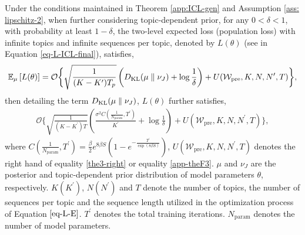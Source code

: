 \begin{theorem*} Under the conditions maintained in Theorem \ref{app:ICL-gen} and Assumption \ref{ass: lipschitz-2}, when further considering topic-dependent prior, for any $0<\delta < 1$, with probability at least $1-\delta$, the two-level expected loss (population loss) with infinite topics and infinite sequences per topic, denoted by $L(\theta)$ (see in Equation \ref{eq-L-ICL-final}), satisfies,
    \begin{align*}
        \mathbb{E}_{\mu}\left[L(\theta) \right]
        =\mathcal{O}\biggl\{\sqrt{\frac{1}{(K-K^\prime)T_p}}\left(D_{\mathrm{KL}}(\mu\parallel \nu_J)+\log \frac{1}{\delta}\right)+ U(\mathcal{W}_{\text{pre}},K,N,N^\prime,T)\biggr\},
    \end{align*}
	then detailing the term $D_{\mathrm{KL}}(\mu \parallel \nu_J)$, $L(\theta)$ further satisfies,
	\begin{align}
			\mathcal{O}\biggl\{\sqrt{\frac{1}{(K-K^\prime)T}}\left(\frac{\sigma^2C(\frac{1}{N_{\text{param}}},{T^\prime})}{K^\prime}+\log \frac{1}{\delta}\right)
			+ U(\mathcal{W}_{\text{pre}},K,N,N^\prime,T)\biggr\}, \nonumber
	\end{align}
	where $C(\frac{1}{N_{\text{param}}},T^\prime)=\frac{\beta}{2}e^{8\beta S}\left(1-e^{-\frac{ T^\prime}{\exp(8\beta S)}}\right)$, $U(\mathcal{W}_{\text{pre}},K,N,N^\prime,T)$ denotes the right hand of equality \ref{the3-right} or equality \ref{app-theF3}. $\mu$ and $\nu_J$ are the posterior and topic-dependent prior distribution of model parameters $\theta$, respectively. $K (K^\prime)$, $N (N^\prime)$ and $T$ denote the number of topics, the number of sequences per topic and the sequence length utilized in the optimization process of Equation $\ref{eq-L-E}$. $T^\prime$ denotes the total training iterations. $N_{\text{param}}$ denotes the number of model parameters.
\end{theorem*}

